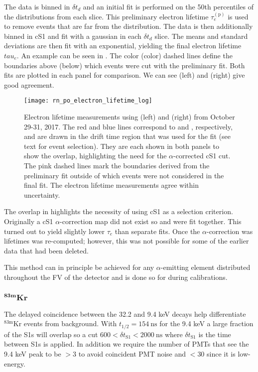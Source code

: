 The data is binned in $\delta t_d$ and an initial fit is performed on the 50th percentiles of the \stwob distributions from each
slice.  This preliminary electron lifetime $\tau_e^{(\mathrm{p})}$ is used to remove events that are far from the distribution.  The data
is then additionally binned in cS1 and fit with a gaussian in each $\delta t_d$ slice.  The means and standard deviations are then fit
with an exponential, yielding the final electron lifetime $tau_e$.  An example can be seen in
.  The color (color) dashed lines define the boundaries above (below) which
events were cut with the preliminary fit.  Both fits are plotted in each panel for comparison.  We can see  (left) and
 (right) give good agreement.

\begin{figure}
\centering
\texttt{[image: rn\_po\_electron\_lifetime\_log]}
\caption{Electron lifetime measurements using  (left) and  (right) from October 29-31, 2017.  The red and blue
lines correspond to  and , respectively, and are drawn in the drift time region that was used for the fit (see
text for event selection).  They are each shown in both panels to show the \stwob overlap, highlighting the need for the
$\alpha$-corrected cS1 cut.  The pink dashed lines mark the boundaries derived from the preliminary fit outside of which events were not
considered in the final fit.  The electron lifetime measurements agree within uncertainty.}
\label{fig:electron_lifetimes_measurement_alphas_elifetime}
\end{figure}

The overlap in \stwob highlights the necessity of using cS1 as a selection criterion.  Originally a cS1 $\alpha$-correction map did not
exist so  and  were fit together.  This turned out to yield slightly lower $\tau_e$ than separate fits.  Once
the $\alpha$-correction was lifetimes was re-computed; however, this was not possible for some of the earlier data that had been
deleted.

This method can in principle be achieved for any $\alpha$-emitting element distributed throughout the FV of the detector and is done so
for  during  calibrations.


\subsubsection{$\mathbf{^{83m}Kr}$}
\label{subsubsec:electron_lifetimes_measurement_kr}
The delayed coincidence between the 32.2 and 9.4 keV decays help differentiate $\mathrm{^{83m}Kr}$ events from background.  With
$t_{1/2} = 154\ \mathrm{ns}$ for the 9.4 keV a large fraction of the S1s will overlap so a cut
$600 < \delta t_{\mathrm{S1}} < 2000\ \mathrm{ns}$
where $\delta t_{\mathrm{S1}}$ is the time between S1s is applied.  In addition we require the number of PMTs that see the 9.4 keV peak
to be $> 3$ to avoid coincident PMT noise and $< 30$ since it is low-energy.

